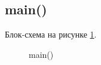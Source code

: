 \subsection{main()}

Блок-схема на рисунке \ref{fig:main}.

\begin{figure}[h]
    \caption{main()}
    \label{fig:main}
\end{figure}





\newpage